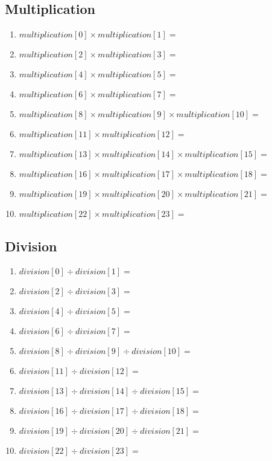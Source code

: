 \documentclass[11pt]{article}
\begin{document}
\subsection{Multiplication}
\begin{enumerate}
	\item ${{ multiplication[0] }} \times {{ multiplication[1] }} =$
	\item ${{ multiplication[2] }} \times {{ multiplication[3] }} =$
	\item ${{ multiplication[4] }} \times {{ multiplication[5] }} =$
	\item ${{ multiplication[6] }} \times {{ multiplication[7] }} =$
	\item ${{ multiplication[8] }} \times {{ multiplication[9] }} \times {{ multiplication[10] }} =$
	\item ${{ multiplication[11] }} \times {{ multiplication[12] }} =$
	\item ${{ multiplication[13] }} \times {{ multiplication[14] }} \times {{ multiplication[15] }} =$
	\item ${{ multiplication[16] }} \times {{ multiplication[17] }} \times {{ multiplication[18] }} =$
	\item ${{ multiplication[19] }} \times {{ multiplication[20] }} \times {{ multiplication[21] }} =$
	\item ${{ multiplication[22] }} \times {{ multiplication[23] }} =$
\end{enumerate}

\subsection{Division}
\begin{enumerate}
	\item ${{ division[0] }} \div {{ division[1] }} =$
	\item ${{ division[2] }} \div {{ division[3] }} =$
	\item ${{ division[4] }} \div {{ division[5] }} =$
	\item ${{ division[6] }} \div {{ division[7] }} =$
	\item ${{ division[8] }} \div {{ division[9] }} \div {{ division[10] }} =$
	\item ${{ division[11] }} \div {{ division[12] }} =$
	\item ${{ division[13] }} \div {{ division[14] }} \div {{ division[15] }} =$
	\item ${{ division[16] }} \div {{ division[17] }} \div {{ division[18] }} =$
	\item ${{ division[19] }} \div {{ division[20] }} \div {{ division[21] }} =$
	\item ${{ division[22] }} \div {{ division[23] }} =$
\end{enumerate}
\end{document}
